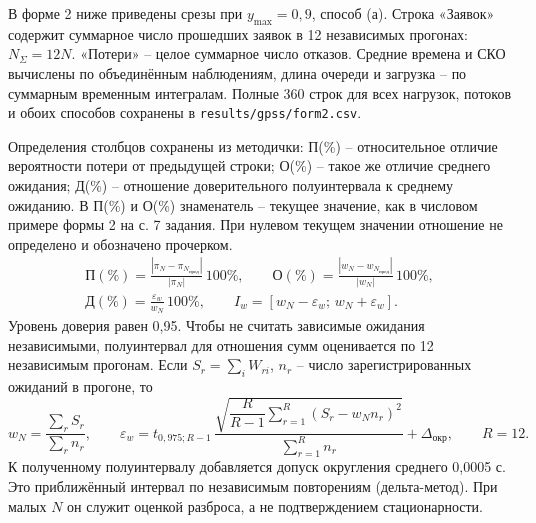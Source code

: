\documentclass[12pt,a4paper]{article}
\begin{document}
В форме 2 ниже приведены срезы при \(y_{\max}=0{,}9\), способ (а). Строка «Заявок» содержит суммарное число прошедших заявок в 12 независимых прогонах: \(N_\Sigma=12N\). «Потери» -- целое суммарное число отказов. Средние времена и СКО вычислены по объединённым наблюдениям, длина очереди и загрузка -- по суммарным временным интегралам. Полные 360 строк для всех нагрузок, потоков и обоих способов сохранены в \texttt{results/gpss/form2.csv}.

Определения столбцов сохранены из методички: П(\%) -- относительное отличие вероятности потери от предыдущей строки; О(\%) -- такое же отличие среднего ожидания; Д(\%) -- отношение доверительного полуинтервала к среднему ожиданию. В П(\%) и О(\%) знаменатель -- текущее значение, как в числовом примере формы 2 на с. 7 задания. При нулевом текущем значении отношение не определено и обозначено прочерком.
\begin{gather}
\text{П}(\%)=\frac{|\pi_N-\pi_{N_{\text{пред}}}|}{|\pi_N|}\,100\%,\qquad
\text{О}(\%)=\frac{|w_N-w_{N_{\text{пред}}}|}{|w_N|}\,100\%,\\
\text{Д}(\%)=\frac{\varepsilon_w}{w_N}\,100\%,\qquad
I_w=[w_N-\varepsilon_w;\,w_N+\varepsilon_w].
\end{gather}
Уровень доверия равен 0,95. Чтобы не считать зависимые ожидания независимыми, полуинтервал для отношения сумм оценивается по 12 независимым прогонам. Если \(S_r=\sum_i W_{ri}\), \(n_r\) -- число зарегистрированных ожиданий в прогоне, то
\begin{equation}
w_N=\frac{\sum_r S_r}{\sum_r n_r},\qquad
\varepsilon_w=t_{0{,}975;R-1}\,
\frac{\sqrt{\dfrac{R}{R-1}\sum_{r=1}^R(S_r-w_N n_r)^2}}{\sum_{r=1}^R n_r}
+\Delta_{\text{окр}},\qquad R=12.
\end{equation}
К полученному полуинтервалу добавляется допуск округления среднего 0,0005 с. Это приближённый интервал по независимым повторениям (дельта-метод). При малых \(N\) он служит оценкой разброса, а не подтверждением стационарности.
\end{document}
